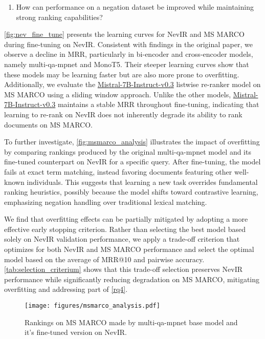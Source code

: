 \begin{enumerate}[label=\textbf{RQ\arabic*}, start=4]  
    \item How can performance on a negation dataset be improved while maintaining strong ranking capabilities? \label{rq4}  
\end{enumerate}

\autoref{fig:nev_fine_tune} presents the learning curves for NevIR and MS MARCO during fine-tuning on NevIR. Consistent with findings in the original paper, we observe a decline in MRR, particularly in bi-encoder and cross-encoder models, namely multi-qa-mpnet and MonoT5. Their steeper learning curves show that these models may be learning faster but are also more prone to overfitting. Additionally, we evaluate the \url{Mistral-7B-Instruct-v0.3} listwise re-ranker model on MS MARCO using a sliding window approach. Unlike the other models, \url{Mistral-7B-Instruct-v0.3} maintains a stable MRR throughout fine-tuning, indicating that learning to re-rank on NevIR does not inherently degrade its ability to rank documents on MS MARCO.

To further investigate, \autoref{fig:msmarco_analysis} illustrates the impact of overfitting by comparing rankings produced by the original multi-qa-mpnet model and its fine-tuned counterpart on NevIR for a specific query. After fine-tuning, the model fails at exact term matching, instead favoring documents featuring other well-known individuals. This suggests that learning a new task overrides fundamental ranking heuristics, possibly because the model shifts toward contrastive learning, emphasizing negation handling over traditional lexical matching.

We find that overfitting effects can be partially mitigated by adopting a more effective early stopping criterion. Rather than selecting the best model based solely on NevIR validation performance, we apply a trade-off criterion that optimizes for both NevIR and MS MARCO performance and select the optimal model based on the average of MRR@10 and pairwise accuracy. \autoref{tab:selection_criterium} shows that this trade-off selection preserves NevIR performance while significantly reducing degradation on MS MARCO, mitigating overfitting and addressing part of \ref{rq4}.

\begin{figure}[tbp]
    \centering
    \texttt{[image: figures/msmarco\_analysis.pdf]}
    \caption{Rankings on MS MARCO made by multi-qa-mpnet base model and it's fine-tuned version on NevIR.}
    \label{fig:msmarco_analysis}
\end{figure}


